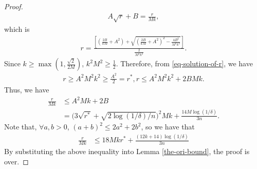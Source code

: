 \documentclass{article}
\begin{document}
\begin{proof}
\begin{align*}
  A\sqrt{r}+B=\frac{r}{Mk},
\end{align*}
which is
\begin{align}
\label{eq-solution-of-r}
  r=\frac{\left[
  \left(
    \frac{2B}{kM}+A^2
    \right)+
    \sqrt{\left(
    \frac{2B}{kM}+A^2
    \right)^2-\frac{4B^2}{M^2k^2}}
  \right]}
  {\frac{2}{M^2k^2}}.
\end{align}
Since $k\geq \max(1,\frac{\sqrt{2}}{2M})$,
$k^2M^2\geq \frac{1}{2}$.
Therefore, from \eqref{eq-solution-of-r}, we have
\begin{align*}
  r\geq A^2M^2k^2\geq \frac{A^2}{2}= r^\ast,
  r\leq A^2M^2k^2+2BMk.
\end{align*}
Thus, we have
\begin{align*}
 \frac{r}{Mk}&\leq A^2Mk+2B \\
 &=\Big(3\sqrt{r^\ast}+\sqrt{{2\log(1/\delta)}/{n}}\Big)^2Mk+\frac{14M\log(1/\delta)}{3n}.
\end{align*}
Note that, $\forall a,b>0$, $(a+b)^2\leq 2a^2+2b^2$,
so we have that
\begin{align*}
  \frac{r}{Mk}&\leq 18Mkr^\ast+\frac{(12k+14)\log(1/\delta)}{3n}
\end{align*}
By substituting the above inequality
 into Lemma \ref{the-ori-bound},
the proof is over.
\end{proof}
\end{document}
